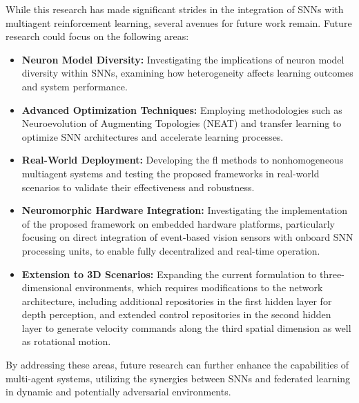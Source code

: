 While this research has made significant strides in the integration of SNNs with multiagent reinforcement learning, several avenues for future work remain. Future research could focus on the following areas:
\begin{itemize}
    \item \textbf{Neuron Model Diversity:} Investigating the implications of neuron model diversity within SNNs, examining how heterogeneity affects learning outcomes and system performance.
    
    \item \textbf{Advanced Optimization Techniques:} Employing methodologies such as Neuroevolution of Augmenting Topologies (NEAT) and transfer learning to optimize SNN architectures and accelerate learning processes.
    
    \item \textbf{Real-World Deployment:} Developing the \ac{fl} methods to nonhomogeneous multiagent systems and testing the proposed frameworks in real-world scenarios to validate their effectiveness and robustness.
    
    \item \textbf{Neuromorphic Hardware Integration:} Investigating the implementation of the proposed framework on embedded hardware platforms, particularly focusing on direct integration of event-based vision sensors with onboard SNN processing units, to enable fully decentralized and real-time operation.
    
    \item \textbf{Extension to 3D Scenarios:} Expanding the current formulation to three-dimensional environments, which requires modifications to the network architecture, including additional repositories in the first hidden layer for depth perception, and extended control repositories in the second hidden layer to generate velocity commands along the third spatial dimension as well as rotational motion.
    
\end{itemize}
By addressing these areas, future research can further enhance the capabilities of multi-agent systems, utilizing the synergies between SNNs and federated learning in dynamic and potentially adversarial environments.
